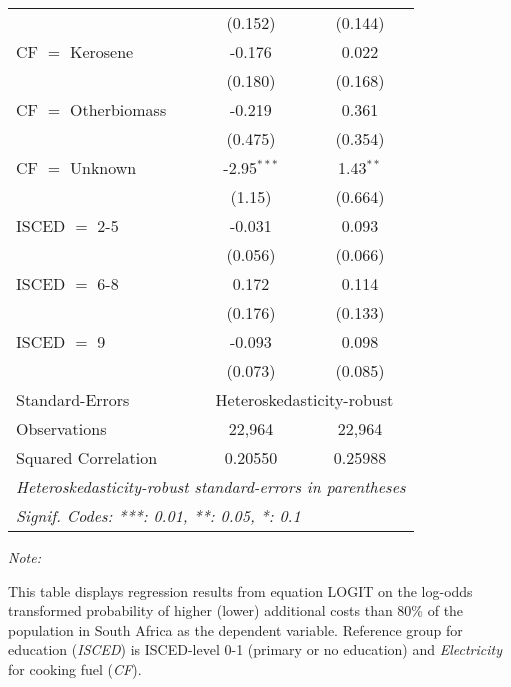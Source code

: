 \begin{table}[htbp!]
\begin{adjustbox}{width = 1\textwidth, max height = 0.95\textheight, center}
\begin{threeparttable}[b]
\begin{tabular}{lcc}
                                 & (0.152)        & (0.144)\\   
            CF $=$ Kerosene      & -0.176         & 0.022\\   
                                 & (0.180)        & (0.168)\\   
            CF $=$ Otherbiomass  & -0.219         & 0.361\\   
                                 & (0.475)        & (0.354)\\   
            CF $=$ Unknown       & -2.95$^{***}$  & 1.43$^{**}$\\   
                                 & (1.15)         & (0.664)\\   
            ISCED $=$ 2-5        & -0.031         & 0.093\\   
                                 & (0.056)        & (0.066)\\   
            ISCED $=$ 6-8        & 0.172          & 0.114\\   
                                 & (0.176)        & (0.133)\\   
            ISCED $=$ 9          & -0.093         & 0.098\\   
                                 & (0.073)        & (0.085)\\   
            \midrule 
            Standard-Errors & \multicolumn{2}{c}{Heteroskedasticity-robust} \\ 
            Observations         & 22,964         & 22,964\\  
            Squared Correlation  & 0.20550        & 0.25988\\  
            \midrule \midrule
            \multicolumn{3}{l}{\emph{Heteroskedasticity-robust standard-errors in parentheses}}\\
            \multicolumn{3}{l}{\emph{Signif. Codes: ***: 0.01, **: 0.05, *: 0.1}}\\
         \end{tabular}
         
         \begin{tablenotes}\item \medskip \textit{Note:}
            \item This table displays regression results from equation LOGIT on the log-odds transformed probability of higher (lower) additional costs than 80\% of the population in South Africa as the dependent variable. Reference group for education (\textit{ISCED}) is ISCED-level 0-1 (primary or no education) and \textit{Electricity} for cooking fuel (\textit{CF}).
         \end{tablenotes}
      \end{threeparttable}
   \end{adjustbox}
\end{table}


